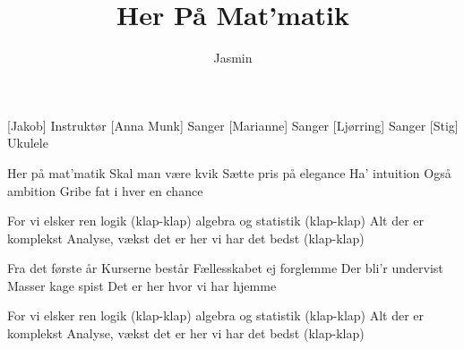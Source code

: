 \documentclass[a4paper,11pt]{article}
\title{Her På Mat'matik}
\author{Jasmin}
\begin{document}
\maketitle

\begin{roles}
[Jakob] Instruktør
[Anna Munk] Sanger
[Marianne] Sanger
[Ljørring] Sanger
[Stig] Ukulele
\end{roles}

\begin{song}


 Her på mat’matik
Skal man være kvik
Sætte pris på elegance
Ha’ intuition
Også ambition
Gribe fat i hver en chance

 For vi elsker ren logik (klap-klap)
algebra og statistik (klap-klap)
Alt der er komplekst
Analyse, vækst
det er her vi har det bedst (klap-klap)

 Fra det første år
Kurserne består
Fællesskabet ej forglemme
Der bli’r undervist
Masser kage spist
Det er her hvor vi har hjemme

 For vi elsker ren logik (klap-klap)
algebra og statistik (klap-klap)
Alt der er komplekst
Analyse, vækst
det er her vi har det bedst (klap-klap)





\end{song}
\end{document}

